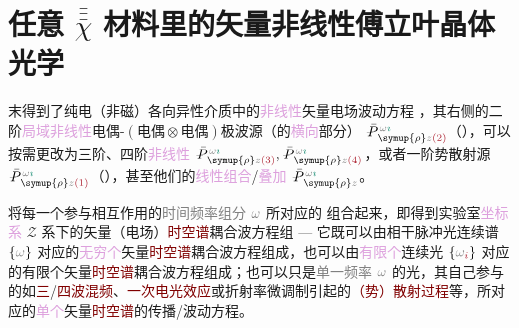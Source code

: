 \chapter{任意 \texorpdfstring{$\bar{\bar{\bar{\chi}}}$}{$\bar{\bar{\bar{\text{χ}}}}$} 材料里的矢量非线性傅立叶晶体光学}\label{chap:NFCO}

 末得到了\textcolor{PineGreen}{纯电（非磁）各向异性}介质中的\textcolor{Plum}{非线性}矢量电场波动方程 ，其右侧的二阶\textcolor{Plum}{局域}\textcolor{Plum}{非线性}\textcolor{NavyBlue}{电偶-$(\text{电偶}\otimes\text{电偶})$}极\textcolor{NavyBlue}{波源}（的\textcolor{Plum}{横向}部分） $\Xint{\mathcolor{gray}{-}}{25}{\bar{P}}^{\;\! \mathcolor{gray}{\omega} \textcolor{PineGreen}{\imath}}_{\;\! \symup{\rho} \mathcolor{gray}{z} \textcolor{Maroon}{(2)}}$（），可以按需更改为三阶、四阶\textcolor{Plum}{非线性} $\Xint{\mathcolor{gray}{-}}{25}{\bar{P}}^{\;\! \mathcolor{gray}{\omega} \textcolor{PineGreen}{\imath}}_{\;\! \symup{\rho} \mathcolor{gray}{z} \textcolor{Maroon}{(3)}}, \Xint{\mathcolor{gray}{-}}{25}{\bar{P}}^{\;\! \mathcolor{gray}{\omega} \textcolor{PineGreen}{\imath}}_{\;\! \symup{\rho} \mathcolor{gray}{z} \textcolor{Maroon}{(4)}}$，或者一阶\textcolor{NavyBlue}{势散射}源 $\Xint{\mathcolor{gray}{-}}{25}{\bar{P}}^{\;\! \mathcolor{gray}{\omega} \textcolor{PineGreen}{\imath}}_{\;\! \symup{\rho} \mathcolor{gray}{z} \textcolor{Maroon}{(1)}}$（），甚至他们的\textcolor{Plum}{线性组合}/\textcolor{Plum}{叠加} $\Xint{\mathcolor{gray}{-}}{25}{\bar{P}}^{\;\! \mathcolor{gray}{\omega} \textcolor{PineGreen}{\imath}}_{\;\! \symup{\rho} \mathcolor{gray}{z}}$。

将每一个参与相互作用的\textcolor{gray}{时间频率组分} $\mathcolor{gray}{\omega}$ 所对应的  组合起来，即得到\textcolor{PineGreen}{实验室}\textcolor{Plum}{坐标系} \textcolor{PineGreen}{$\mathcal{Z}$ 系}下的矢量（电场）\textcolor{Maroon}{时空谱}耦合波方程组 --- 它既可以由相干\textcolor{NavyBlue}{脉冲光连续谱} $\left\{ \mathcolor{gray}{\omega} \right\}$ 对应的\textcolor{Plum}{无穷个}矢量\textcolor{Maroon}{时空谱}耦合波方程组成，也可以由\textcolor{Plum}{有限个}\textcolor{NavyBlue}{连续光} $\left\{ \mathcolor{gray}{\omega}_{\textcolor{Maroon}{i}} \right\}$ 对应的有限个矢量\textcolor{Maroon}{时空谱}耦合波方程组成；也可以只是\textcolor{gray}{单一频率} $\mathcolor{gray}{\omega}$ 的光，其自己参与的如\textcolor{Maroon}{三}/\textcolor{Maroon}{四波混频}、\textcolor{Maroon}{一次电光效应}或\textcolor{PineGreen}{折射率微调制}引起的\textcolor{Maroon}{（势）散射过程}等，所对应的\textcolor{Plum}{单个}矢量\textcolor{Maroon}{时空谱}的传播/波动方程。

